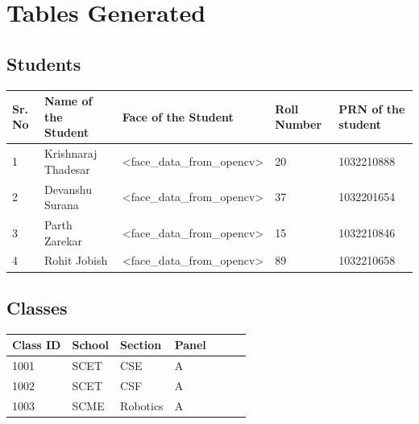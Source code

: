\documentclass[11pt]{article}
\begin{document}
\section{Tables Generated}

\subsection{Students}

\begin{table}[H]
	\begin{tabular}{|l|l|l|l|l|}
		\hline
		\textbf{Sr. No } & \textbf{Name of the Student } & \textbf{Face of the Student                               } & \textbf{Roll Number} & \textbf{PRN of the student } \\ \hline
		1                & Krishnaraj Thadesar           & \textless{}face\_data\_from\_opencv\textgreater{}           & 20                   & 1032210888                   \\ \hline
		2                & Devanshu Surana               & \textless{}face\_data\_from\_opencv\textgreater{}           & 37                   & 1032201654                   \\ \hline
		3                & Parth Zarekar                 & \textless{}face\_data\_from\_opencv\textgreater{}           & 15                   & 1032210846                   \\ \hline
		4                & Rohit Jobish                  & \textless{}face\_data\_from\_opencv\textgreater{}           & 89                   & 1032210658                   \\ \hline
	\end{tabular}
\end{table}

\subsection{Classes}

\begin{table}[H]
	\begin{tabular}{|l|l|l|l|l|l|l|}
		\hline
		\textbf{Class ID } & \textbf{School } & \textbf{Section  } & \textbf{Panel } \\ \hline
		1001               & SCET             & CSE                & A               \\ \hline
		1002               & SCET             & CSF                & A               \\ \hline
		1003               & SCME             & Robotics           & A               \\ \hline
	\end{tabular}
\end{table}
\end{document}
